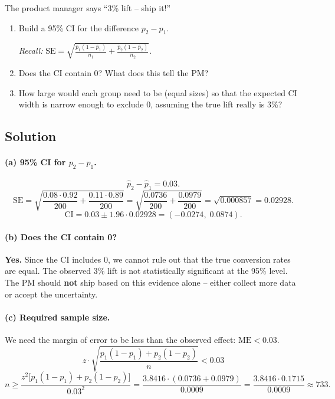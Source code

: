\documentclass[11pt]{article}
\begin{document}
The product manager says ``3\% lift -- ship it!''

\begin{enumerate}[label=\alph*)]
  \item Build a 95\% CI for the difference $p_2 - p_1$.

  \emph{Recall:} $\text{SE} = \sqrt{\frac{\hat{p}_1(1-\hat{p}_1)}{n_1} + \frac{\hat{p}_2(1-\hat{p}_2)}{n_2}}$.
  \item Does the CI contain 0? What does this tell the PM?
  \item How large would each group need to be (equal sizes) so that the expected CI width is narrow enough to exclude 0, assuming the true lift really is 3\%?
\end{enumerate}

\subsection*{Solution}

\paragraph{(a) 95\% CI for $p_2 - p_1$.}

\[
  \hat{p}_2 - \hat{p}_1 = 0.03.
\]
\[
  \text{SE} = \sqrt{\frac{0.08 \cdot 0.92}{200} + \frac{0.11 \cdot 0.89}{200}}
  = \sqrt{\frac{0.0736}{200} + \frac{0.0979}{200}}
  = \sqrt{0.000857}
  = 0.02928.
\]
\[
  \text{CI} = 0.03 \pm 1.96 \cdot 0.02928 = (-0.0274,\; 0.0874).
\]

\paragraph{(b) Does the CI contain 0?}

\textbf{Yes.} Since the CI includes 0, we cannot rule out that the true conversion rates are equal. The observed 3\% lift is not statistically significant at the 95\% level. The PM should \textbf{not} ship based on this evidence alone -- either collect more data or accept the uncertainty.

\paragraph{(c) Required sample size.}

We need the margin of error to be less than the observed effect: $\text{ME} < 0.03$.
\[
  z \cdot \sqrt{\frac{p_1(1-p_1) + p_2(1-p_2)}{n}} < 0.03
\]
\[
  n \geq \frac{z^2 \bigl[p_1(1-p_1) + p_2(1-p_2)\bigr]}{0.03^2}
  = \frac{3.8416 \cdot (0.0736 + 0.0979)}{0.0009}
  = \frac{3.8416 \cdot 0.1715}{0.0009}
  \approx 733.
\]
\end{document}
